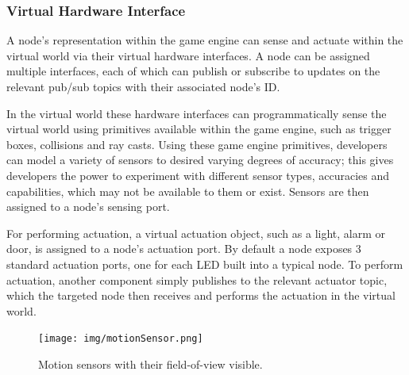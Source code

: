 
\subsubsection{Virtual Hardware Interface} %
\label{ssub:virtual_hardware_interface}
A node's representation within the game engine can sense and actuate within the virtual world via their virtual hardware interfaces. A node can be assigned multiple interfaces, each of which can publish or subscribe to updates on the relevant pub/sub topics with their associated node's ID. 

In the virtual world these hardware interfaces can programmatically sense the virtual world using primitives available within the game engine, such as trigger boxes, collisions and ray casts. Using these game engine primitives, developers can model a variety of sensors to desired varying degrees of accuracy; this gives developers the power to experiment with different sensor types, accuracies and capabilities, which may not be available to them or exist. Sensors are then assigned to a node's sensing port. 

For performing actuation, a virtual actuation object, such as a light, alarm or door, is assigned to a node's actuation port. By default a node exposes 3 standard actuation ports, one for each LED built into a typical node. To perform actuation, another component simply publishes to the relevant actuator topic, which the targeted node then receives and performs the actuation in the virtual world.

\begin{figure}[tbh]
  \centering
  \texttt{[image: img/motionSensor.png]}
  \caption{Motion sensors with their field-of-view visible.}
  \label{fig:motionSensor}
\end{figure}

